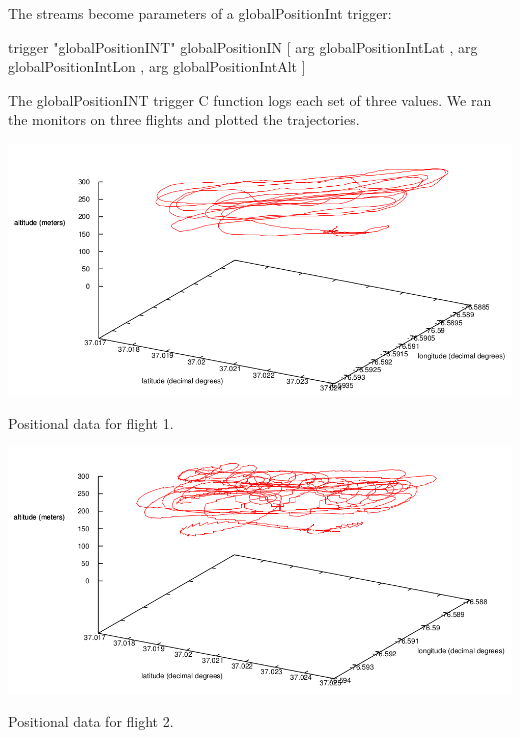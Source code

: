 The streams become parameters of a globalPositionInt trigger:

\begin{code}
trigger "globalPositionINT" globalPositionIN
                  [ arg globalPositionIntLat
                  , arg globalPositionIntLon
                  , arg globalPositionIntAlt ]
\end{code}

The globalPositionINT trigger C function logs each set of three values. We ran
the monitors on three flights and plotted the trajectories.

\begin{myfig}[ht!]
  \centering
    \includegraphics[width=1\textwidth]{Figs/flight1.png}
    \caption{Positional data for flight 1.\label{fig:flight1}}
\end{myfig}%
\begin{myfig}[ht!]
 \centering
    \includegraphics[width=1\textwidth]{Figs/flight3.png}
    \caption{Positional data for flight 2.\label{fig:flight2}}
\end{myfig}

